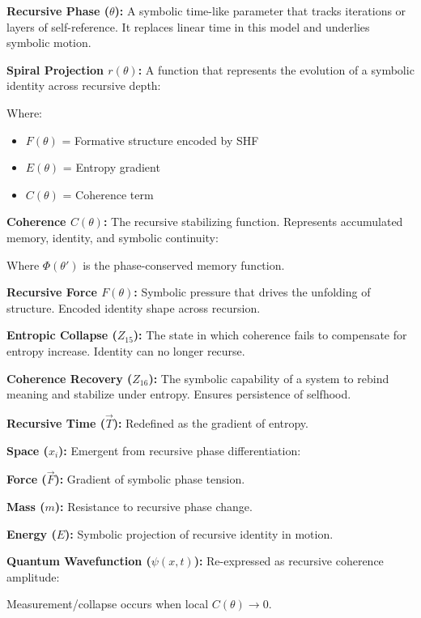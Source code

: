 \documentclass[12pt]{article}
\begin{document}
\textbf{Recursive Phase ($\theta$):} A symbolic time-like parameter that tracks iterations or layers of self-reference. It replaces linear time in this model and underlies symbolic motion.

\textbf{Spiral Projection $r(\theta)$:} A function that represents the evolution of a symbolic identity across recursive depth:

Where:
\begin{itemize}
\item $F(\theta)$ = Formative structure encoded by SHF
\item $E(\theta)$ = Entropy gradient
\item $C(\theta)$ = Coherence term
\end{itemize}

\textbf{Coherence $C(\theta)$:} The recursive stabilizing function. Represents accumulated memory, identity, and symbolic continuity:

Where $\Phi(\theta')$ is the phase-conserved memory function.

\textbf{Recursive Force $F(\theta)$:} Symbolic pressure that drives the unfolding of structure. Encoded identity shape across recursion.

\textbf{Entropic Collapse ($Z_{15}$):} The state in which coherence fails to compensate for entropy increase. Identity can no longer recurse.

\textbf{Coherence Recovery ($Z_{16}$):} The symbolic capability of a system to rebind meaning and stabilize under entropy. Ensures persistence of selfhood.

\textbf{Recursive Time ($\vec{T}$):} Redefined as the gradient of entropy.

\textbf{Space ($x_i$):} Emergent from recursive phase differentiation:

\textbf{Force ($\vec{F}$):} Gradient of symbolic phase tension.

\textbf{Mass ($m$):} Resistance to recursive phase change.

\textbf{Energy ($E$):} Symbolic projection of recursive identity in motion.

\textbf{Quantum Wavefunction ($\psi(x,t)$):} Re-expressed as recursive coherence amplitude:

Measurement/collapse occurs when local $C(\theta) \rightarrow 0$.
\end{document}
